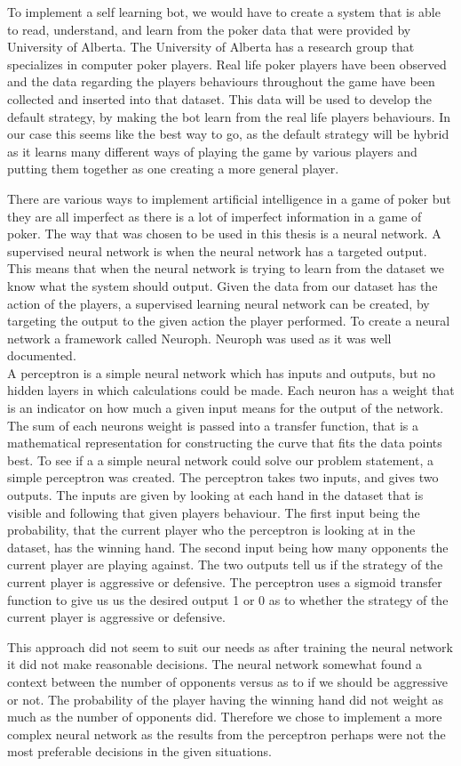 To implement a self learning bot, we would have to create a system that is able to read, understand, and learn from the poker data that were provided by University of Alberta. The University of Alberta has a research group that specializes in computer poker players.  Real life poker players have been observed and the data regarding the players behaviours throughout the game have been collected and inserted into that dataset. 
This data will be used to develop the default strategy, by making the bot learn from the real life players behaviours.
In our case this seems like the best way to go, as the default strategy will be hybrid as it learns many different ways of 
playing the game by various players and putting them together as one creating a more general player.


There are various ways to implement artificial intelligence in a game of poker but they are all imperfect as there is a lot of imperfect information in a game of poker. The way that was chosen to be used in this thesis is a neural network. A supervised neural network is when the neural network has a targeted output. This means that when the neural network is trying to learn from the dataset we know what the system should output. Given the data from our dataset has the action of the players, a supervised learning neural network can be created, by targeting the output to the given action the player performed. To create a neural network a framework called Neuroph. Neuroph was used as it was well documented.\\


A perceptron is a simple neural network which has inputs and outputs, but no hidden layers in which calculations could be made. Each neuron has a weight that is an indicator on how much a given input means for the output of the network. The sum of each neurons weight is passed into a transfer function, that is a mathematical representation for constructing the curve that fits the data points best.
To see if a a simple neural network could solve our problem statement, a simple perceptron was created. The perceptron takes two inputs, and gives two outputs. The inputs are given by looking at each hand in the dataset that is visible and following that given players behaviour.
The first input being the probability, that the current player who the perceptron is looking at in the dataset, has the winning hand. The second input being how many opponents the current player are playing against. 
The two outputs tell us if the strategy of the current player is aggressive or defensive. 
The perceptron uses a sigmoid transfer function to give us us the desired output 1 or 0 as to whether the strategy of the current player is aggressive or defensive.

This approach did not seem to suit our needs as after training the neural network it did not make reasonable decisions. The neural network somewhat found a context between the number of opponents versus as to if we should be aggressive or not. The probability of the player having the winning hand did not weight as much as the number of opponents did. Therefore we chose to implement a more complex neural network as the results from the perceptron perhaps were not the most preferable decisions in the given situations.\\



